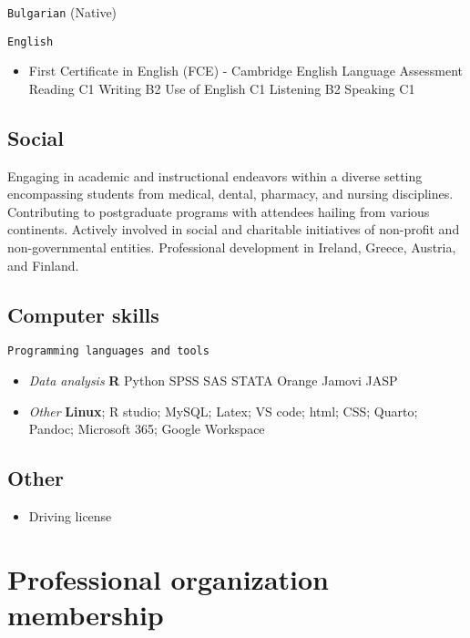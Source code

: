 \documentclass[
  12pt,
  letterpaper,
  DIV=11,
  numbers=noendperiod]{scrartcl}
\providecommand{\tightlist}{%
  \setlength{\itemsep}{0pt}\setlength{\parskip}{0pt}}\usepackage{longtable,booktabs,array}
\begin{document}
\texttt{Bulgarian} (Native)

\texttt{English}

\begin{itemize}
\tightlist
\item
  First Certificate in English (FCE) - Cambridge English Language
  Assessment \textbar{} Reading C1 \textbar{} Writing B2 \textbar{} Use
  of English C1 \textbar{} Listening B2 \textbar{} Speaking C1
\end{itemize}

\subsection{Social}\label{social}

Engaging in academic and instructional endeavors within a diverse
setting encompassing students from medical, dental, pharmacy, and
nursing disciplines. Contributing to postgraduate programs with
attendees hailing from various continents. Actively involved in social
and charitable initiatives of non-profit and non-governmental entities.
Professional development in Ireland, Greece, Austria, and Finland.

\subsection{Computer skills}\label{computer-skills}

\texttt{Programming\ languages\ and\ tools}

\begin{itemize}
\item
  \emph{Data analysis} \textbf{R} \textbar{} Python \textbar{} SPSS
  \textbar{} SAS \textbar{} STATA \textbar{} Orange \textbar{} Jamovi
  \textbar{} JASP
\item
  \emph{Other} \textbf{Linux}; R studio; MySQL; Latex; VS code; html;
  CSS; Quarto; Pandoc; Microsoft 365; Google Workspace
\end{itemize}

\subsection{Other}\label{other}

\begin{itemize}
\tightlist
\item
  Driving license
\end{itemize}

\section{Professional organization
membership}\label{professional-organization-membership}
\end{document}
